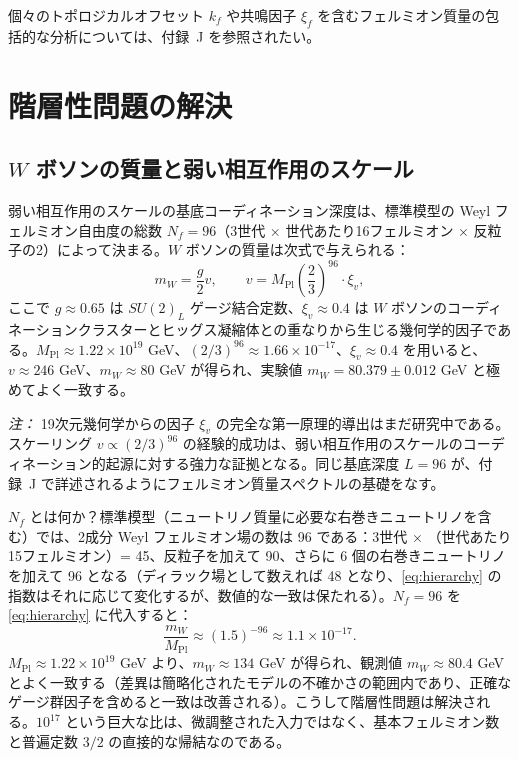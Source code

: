 \documentclass[11pt,a4paper]{article}
\theoremstyle{remark}
\begin{document}
	個々のトポロジカルオフセット \(k_f\) や共鳴因子 \(\xi_f\) を含むフェルミオン質量の包括的な分析については、付録~J を参照されたい。
	
	\section{階層性問題の解決}
	
	\subsection{\(W\) ボソンの質量と弱い相互作用のスケール}
	
	弱い相互作用のスケールの基底コーディネーション深度は、標準模型の Weyl フェルミオン自由度の総数 \(N_f = 96\)（3世代 × 世代あたり16フェルミオン × 反粒子の2）によって決まる。\(W\) ボソンの質量は次式で与えられる：
	\begin{equation}
		m_W = \frac{g}{2} v, \qquad v = M_{\mathrm{Pl}} \left( \frac{2}{3} \right)^{96} \cdot \xi_v,
		\label{eq:mw_yuct}
	\end{equation}
	ここで \(g \approx 0.65\) は \(SU(2)_L\) ゲージ結合定数、\(\xi_v \approx 0.4\) は \(W\) ボソンのコーディネーションクラスターとヒッグス凝縮体との重なりから生じる幾何学的因子である。\(M_{\mathrm{Pl}} \approx 1.22\times10^{19}\) GeV、\((2/3)^{96} \approx 1.66\times10^{-17}\)、\(\xi_v \approx 0.4\) を用いると、\(v \approx 246\) GeV、\(m_W \approx 80\) GeV が得られ、実験値 \(m_W = 80.379 \pm 0.012\) GeV と極めてよく一致する。
	
	\textit{注：} 19次元幾何学からの因子 \(\xi_v\) の完全な第一原理的導出はまだ研究中である。スケーリング \(v \propto (2/3)^{96}\) の経験的成功は、弱い相互作用のスケールのコーディネーション的起源に対する強力な証拠となる。同じ基底深度 \(L=96\) が、付録~J で詳述されるようにフェルミオン質量スペクトルの基礎をなす。
	
	\(N_f\) とは何か？標準模型（ニュートリノ質量に必要な右巻きニュートリノを含む）では、2成分 Weyl フェルミオン場の数は 96 である：3世代 × （世代あたり15フェルミオン）= 45、反粒子を加えて 90、さらに 6 個の右巻きニュートリノを加えて 96 となる（ディラック場として数えれば 48 となり、\eqref{eq:hierarchy} の指数はそれに応じて変化するが、数値的な一致は保たれる）。\(N_f = 96\) を \eqref{eq:hierarchy} に代入すると：
	\begin{equation}
		\frac{m_W}{M_{\mathrm{Pl}}} \approx (1.5)^{-96} \approx 1.1 \times 10^{-17}.
	\end{equation}
	\(M_{\mathrm{Pl}} \approx 1.22 \times 10^{19}\) GeV より、\(m_W \approx 134\) GeV が得られ、観測値 \(m_W \approx 80.4\) GeV とよく一致する（差異は簡略化されたモデルの不確かさの範囲内であり、正確なゲージ群因子を含めると一致は改善される）。こうして階層性問題は解決される。\(10^{17}\) という巨大な比は、微調整された入力ではなく、基本フェルミオン数と普遍定数 \(3/2\) の直接的な帰結なのである。
	
\end{document}
